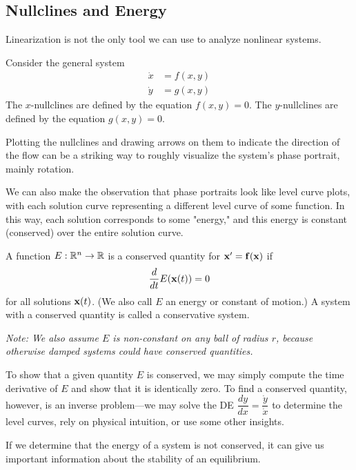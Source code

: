 \documentclass[../m082main.tex]{subfiles}
\begin{document}
\subsection{Nullclines and Energy}
Linearization is not the only tool we can use to analyze nonlinear systems.

\begin{definition}[Nullclines]
    Consider the general system
    \begin{align*}
        \dot x &= f(x,y) \\
        \dot y &= g(x,y)
    \end{align*}
    The $x$-nullclines are defined by the equation $f(x,y) = 0$.
    The $y$-nullclines are defined by the equation $g(x,y) = 0$.
\end{definition}

Plotting the nullclines and drawing arrows on them to indicate the direction of the flow can be a striking way to roughly visualize the system's phase portrait, mainly rotation.

We can also make the observation that phase portraits look like level curve plots, with each solution curve representing a different level curve of some function.
In this way, each solution corresponds to some "energy," and this energy is constant (conserved) over the entire solution curve.

\begin{definition}
    A function $E : \mathbb{R}^n \to \mathbb{R}$ is a conserved quantity for $\mathbf{x}' = \mathbf{f} (\mathbf{x})$ if
    \[ \frac{d}{dt} E (\mathbf{x} (t)) = 0 \]
    for all solutions $\mathbf{x} (t)$.
    (We also call $E$ an energy or constant of motion.)
    A system with a conserved quantity is called a conservative system.

    \textit{Note: We also assume $E$ is non-constant on any ball of radius $r$, because otherwise damped systems could have conserved quantities.}
\end{definition}

To show that a given quantity $E$ is conserved, we may simply compute the time derivative of $E$ and show that it is identically zero.
To find a conserved quantity, however, is an inverse problem---we may solve the DE $\dfrac{dy}{dx} = \dfrac{\dot y}{\dot x}$ to determine the level curves, rely on physical intuition, or use some other insights.

If we determine that the energy of a system is not conserved, it can give us important information about the stability of an equilibrium.
\end{document}
